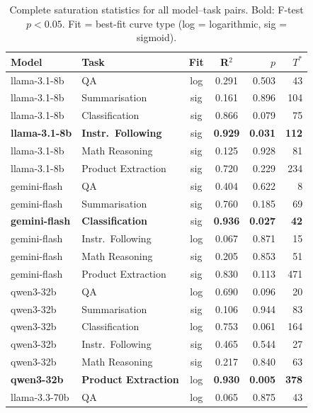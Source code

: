 \begin{table}[h]
\centering
\caption{Complete saturation statistics for all model--task pairs.
  Bold: F-test $p < 0.05$.
  Fit = best-fit curve type (log = logarithmic, sig = sigmoid).}
\label{tab:full-stats}
\footnotesize
\begin{tabular}{llccrr}
\toprule
Model & Task & Fit & R$^2$ & $p$ & $T^*$ \\
\midrule
llama-3.1-8b  & QA                 & log & 0.291 & 0.503 & 43  \\
llama-3.1-8b  & Summarisation      & sig & 0.161 & 0.896 & 104 \\
llama-3.1-8b  & Classification     & sig & 0.866 & 0.079 & 75  \\
\textbf{llama-3.1-8b}  & \textbf{Instr.\ Following} & sig & \textbf{0.929} & \textbf{0.031} & \textbf{112} \\
llama-3.1-8b  & Math Reasoning     & sig & 0.125 & 0.928 & 81  \\
llama-3.1-8b  & Product Extraction & sig & 0.720 & 0.229 & 234 \\
\midrule
gemini-flash  & QA                 & sig & 0.404 & 0.622 & 8   \\
gemini-flash  & Summarisation      & sig & 0.760 & 0.185 & 69  \\
\textbf{gemini-flash}  & \textbf{Classification}    & sig & \textbf{0.936} & \textbf{0.027} & \textbf{42}  \\
gemini-flash  & Instr.\ Following  & log & 0.067 & 0.871 & 15  \\
gemini-flash  & Math Reasoning     & sig & 0.205 & 0.853 & 51  \\
gemini-flash  & Product Extraction & sig & 0.830 & 0.113 & 471 \\
\midrule
qwen3-32b     & QA                 & log & 0.690 & 0.096 & 20  \\
qwen3-32b     & Summarisation      & sig & 0.106 & 0.944 & 83  \\
qwen3-32b     & Classification     & log & 0.753 & 0.061 & 164 \\
qwen3-32b     & Instr.\ Following  & sig & 0.465 & 0.544 & 27  \\
qwen3-32b     & Math Reasoning     & sig & 0.217 & 0.840 & 63  \\
\textbf{qwen3-32b}     & \textbf{Product Extraction} & log & \textbf{0.930} & \textbf{0.005} & \textbf{378} \\
\midrule
llama-3.3-70b & QA                 & log & 0.065 & 0.875 & 43  \\

\end{tabular}
\end{table}
